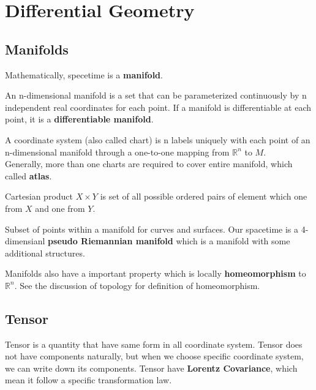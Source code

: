 \documentclass[12pt]{article}
\theoremstyle{mystyle}{\newtheorem{definition}{Definition}[section]}
\theoremstyle{mystyle}{\newtheorem{theorem}[definition]{Theorem}}
\theoremstyle{mystyle}{\newtheorem*{remark}{Remark}}
\theoremstyle{mystyle}{\newtheorem*{example}{Example}}
\theoremstyle{mystyle}{\newtheorem*{examples}{Examples}}
\theoremstyle{cstyle}{\newtheorem*{cthm}{}}
\begin{document}
\newpage

\section{Differential Geometry}
\subsection{Manifolds}
Mathematically, specetime is a \textbf{manifold}.
\begin{definition}
  An n-dimensional manifold is a set that can be parameterized continuously by n independent real coordinates for each point.
  If a manifold is differentiable at each point, it is a \textbf{differentiable manifold}.
\end{definition}
\begin{definition}
  A coordinate system (also called chart) is n labels uniquely with each point of an n-dimensional manifold through a one-to-one mapping from
  $\mathbb{R}^n$ to $M$.\\
  Generally, more than one charts are required to cover entire manifold, which called \textbf{atlas}.
\end{definition}
\begin{definition}
  Cartesian product $X \times Y$ is set of all possible ordered pairs of element which one from $X$ and one from $Y$.
\end{definition}
Subset of points within a manifold for curves and surfaces. Our spacetime is a 4-dimensianl \textbf{pseudo Riemannian manifold}
which is a manifold with some additional structures.
\begin{remark}
  Manifolds also have a important property which is locally \textbf{homeomorphism} to $\mathbb{R}^n$. See the discussion of
  topology for definition of homeomorphism.
\end{remark}
\subsection{Tensor}
Tensor is a quantity that have same form in all coordinate system.
Tensor does not have components naturally, but when we choose specific coordinate system, we can write down its components.
Tensor have \textbf{Lorentz Covariance}, which mean it follow a specific transformation law.
\end{document}
